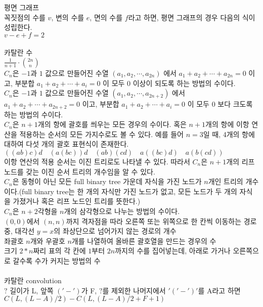 \documentclass[landscape, 8pt, a4paper, oneside, twocolumn]{extarticle}
\begin{document}
		평면 그래프\\
		꼭짓점의 수를 $v$, 변의 수를 $e$, 면의 수를 $f$라고 하면, 평면 그래프의 경우 다음의 식이 성립한다.\\
		$v-e+f=2$\\\\
		카탈란 수\\
		$\frac{1}{n+1}\cdot \binom{2n}{n}$\\
		$C_{n}$은 $-1$과 $1$ 값으로 만들어진 수열 $(a_{1}, a_{2}, \cdots ,a_{2n})$ 에서 $a_{1}+a_{2}+\cdots +a_{2n}=0$ 이고, 부분합 $a_{1}+a_{2}+\cdots +a_{i}=0$ 이 모두 0 이상이 되도록 하는 방법의 수이다.\\
		$C_{n}$은 $-1$과 $1$ 값으로 만들어진 수열 $(a_{1}, a_{2}, \cdots ,a_{2n+2})$ 에서 $a_{1}+a_{2}+\cdots +a_{2n+2}=0$ 이고, 부분합 $a_{1}+a_{2}+\cdots +a_{i}=0$ 이 모두 0 보다 크도록 하는 방법의 수이다.\\
		$C_{n}$은 $n+1$개의 항에 괄호를 씌우는 모든 경우의 수이다. 혹은 $n+1$개의 항에 이항 연산을 적용하는 순서의 모든 가지수로도 볼 수 있다. 예를 들어 $n=3$일 때, 4개의 항에 대하여 다섯 개의 괄호 표현식이 존재한다.\\
		$((ab)c)d\quad (a(bc))d\quad (ab)(cd)\quad a((bc)d)\quad a(b(cd))$\\
		이항 연산의 적용 순서는 이진 트리로도 나타낼 수 있다. 따라서 $C_{n}$은 $n+1$개의 리프 노드를 갖는 이진 순서 트리의 개수임을 알 수 있다.\\
		$C_{n}$은 동형이 아닌 모든 full binary tree 가운데 자식을 가진 노드가 $n$개인 트리의 개수이다.(full binary tree는 한 개의 자식만 가진 노드가 없고, 모든 노드가 두 개의 자식을 가졌거나 혹은 리프 노드인 트리를 뜻한다.)\\
		$C_{n}$은 $n+2$각형을 $n$개의 삼각형으로 나누는 방법의 수이다.\\
		$(0,0)$에서 $(n,n)$까지 격자점을 따라 오른쪽 또는 위쪽으로 한 칸씩 이동하는 경로 중, 대각선 $y=x$의 좌상단으로 넘어가지 않는 경로의 개수\\
		좌괄호 $n$개와 우괄호 $n$개를 나열하여 올바른 괄호열을 만드는 경우의 수\\
		크기 $2*n$짜리 표의 각 칸에 $1$부터 $2n$까지의 수를 집어넣는데, 아래로 가거나 오른쪽으로 갈수록 수가 커지는 방법의 수\\\\
		카탈란 convolution\\
		$?$ 길이가 L, 앞쪽 $('-')$가 F, $?$를 제외한 나머지에서 $'('-')'$를 A라고 하면 $C(L, (L-A)/2) - C(L, (L-A)/2+F+1)$\\\\
\end{document}
